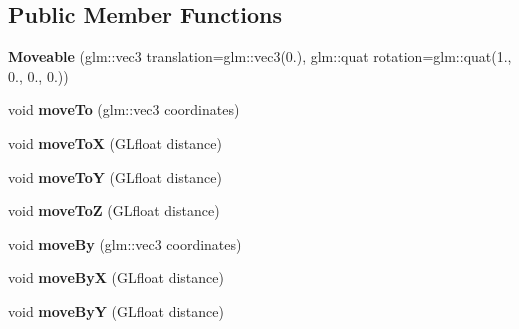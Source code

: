 \subsection*{Public Member Functions}
\begin{DoxyCompactItemize}
\item 
{\bfseries Moveable} (glm\+::vec3 translation=glm\+::vec3(0.), glm\+::quat rotation=glm\+::quat(1., 0., 0., 0.))\hypertarget{classflw_1_1flf_1_1Moveable_a5b326b3787703ae5e6dbc622a467bd8e}{}\label{classflw_1_1flf_1_1Moveable_a5b326b3787703ae5e6dbc622a467bd8e}

\item 
void {\bfseries move\+To} (glm\+::vec3 coordinates)\hypertarget{classflw_1_1flf_1_1Moveable_a67fbd8b45d4087f1aff3fb873684e6ca}{}\label{classflw_1_1flf_1_1Moveable_a67fbd8b45d4087f1aff3fb873684e6ca}

\item 
void {\bfseries move\+ToX} (G\+Lfloat distance)\hypertarget{classflw_1_1flf_1_1Moveable_a0c02748df9356f869305c0253e0c31fd}{}\label{classflw_1_1flf_1_1Moveable_a0c02748df9356f869305c0253e0c31fd}

\item 
void {\bfseries move\+ToY} (G\+Lfloat distance)\hypertarget{classflw_1_1flf_1_1Moveable_ace70342b30fdf0954e75d5bd04074c60}{}\label{classflw_1_1flf_1_1Moveable_ace70342b30fdf0954e75d5bd04074c60}

\item 
void {\bfseries move\+ToZ} (G\+Lfloat distance)\hypertarget{classflw_1_1flf_1_1Moveable_a4a7158c63dbe20ec6bdddbcacbe7cef8}{}\label{classflw_1_1flf_1_1Moveable_a4a7158c63dbe20ec6bdddbcacbe7cef8}

\item 
void {\bfseries move\+By} (glm\+::vec3 coordinates)\hypertarget{classflw_1_1flf_1_1Moveable_aaff5a1860e9a194a429db36ae3c0c4d4}{}\label{classflw_1_1flf_1_1Moveable_aaff5a1860e9a194a429db36ae3c0c4d4}

\item 
void {\bfseries move\+ByX} (G\+Lfloat distance)\hypertarget{classflw_1_1flf_1_1Moveable_ad181d788d972de663a04c2fd5b533f31}{}\label{classflw_1_1flf_1_1Moveable_ad181d788d972de663a04c2fd5b533f31}

\item 
void {\bfseries move\+ByY} (G\+Lfloat distance)\hypertarget{classflw_1_1flf_1_1Moveable_a40893a5b81ede99c80f246a225894058}{}\label{classflw_1_1flf_1_1Moveable_a40893a5b81ede99c80f246a225894058}


\end{DoxyCompactItemize}
